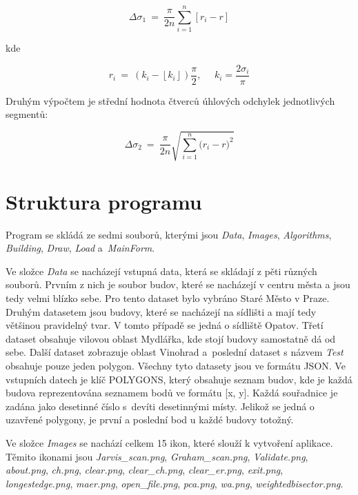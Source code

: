 \documentclass{article}
\begin{document}
\begin{spacing}{1.5}
$$\Delta\sigma_1\ =\ \frac{\pi}{2n} \sum_{i = 1}^{n} [r_i - r]$$

kde

$$r_i\ =\ (k_i- \left\lfloor k_i\right\rfloor)\frac{\pi}{2},\ \ \ \ \ \ k_i = \frac{{2\sigma}_i}{\pi}$$

Druhým výpočtem je střední hodnota čtverců úhlových odchylek jednotlivých segmentů:

$$\Delta\sigma_2\ =\ \frac{\pi}{2n}\sqrt{\sum_{i = 1}^{n}{({r_i - r)}^2}}$$

\section{Struktura programu}
Program se skládá ze sedmi souborů, kterými jsou \textit{Data}, \textit{Images}, \textit{Algorithms}, \textit{Building}, \textit{Draw}, \textit{Load} a~\textit{MainForm}. 

Ve složce \textit{Data} se nacházejí vstupná data, která se skládají z pěti různých souborů. Prvním z nich je soubor budov, které se nacházejí v centru města a jsou tedy velmi blízko sebe. Pro tento dataset bylo vybráno Staré Město v Praze. Druhým datasetem jsou budovy, které se nacházejí na sídlišti a mají tedy většinou pravidelný tvar. V tomto případě se jedná o sídliště Opatov. Třetí dataset obsahuje vilovou oblast Mydlářka, kde stojí budovy samostatně dá od sebe. Další dataset zobrazuje oblast Vinohrad a~poslední dataset s názvem \textit{Test} obsahuje pouze jeden polygon. Všechny tyto datasety jsou ve formátu JSON. Ve vstupních datech je klíč POLYGONS, který obsahuje seznam budov, kde je každá budova reprezentována seznamem bodů ve formátu [x, y].  Každá souřadnice je zadána jako desetinné číslo s~devíti desetinnými místy. Jelikož se jedná o uzavřené polygony, je první a poslední bod u každé budovy totožný. 

Ve složce \textit{Images} se nachází celkem 15 ikon, které slouží k vytvoření aplikace. Těmito ikonami jsou \textit{Jarvis\_scan.png}, \textit{Graham\_scan.png}, \textit{Validate.png}, \textit{about.png}, \textit{ch.png}, \textit{clear.png}, \textit{clear\_ch.png}, \textit{clear\_er.png}, \textit{exit.png}, \textit{longestedge.png}, \textit{maer.png}, \textit{open\_file.png}, \textit{pca.png}, \textit{wa.png}, \textit{weightedbisector.png}. 


\end{spacing}
\end{document}
